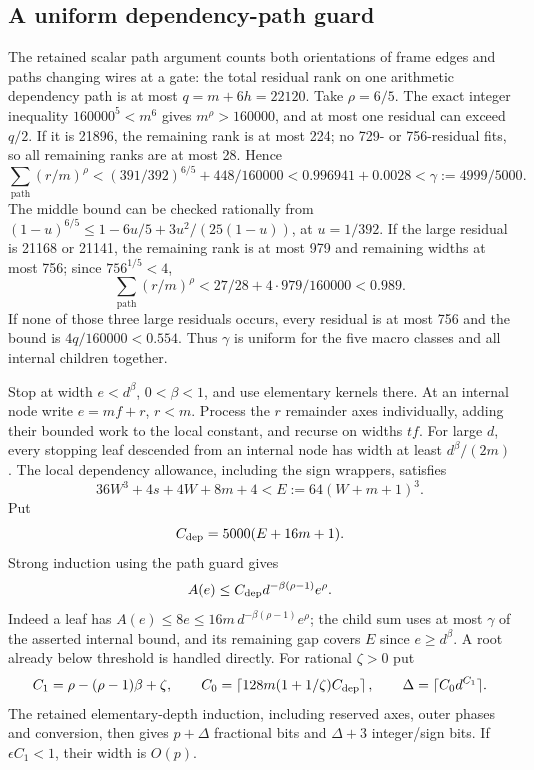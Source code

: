 \subsection{A uniform dependency-path guard}
The retained scalar path argument counts both orientations of frame
edges and paths changing wires at a gate: the total residual rank on
one arithmetic dependency path is at most $q=m+6h=22120$.
Take $\rho=6/5$. The exact integer inequality $160000^5<m^6$ gives
$m^\rho>160000$, and at most one residual can exceed $q/2$.
If it is 21896, the remaining rank is at most 224; no 729- or
756-residual fits, so all remaining ranks are at most 28. Hence
\[
 \sum_{\text{path}}(r/m)^\rho
 <(391/392)^{6/5}+448/160000
 <0.996941+0.0028<\gamma:=4999/5000.
\]
The middle bound can be checked rationally from
$(1-u)^{6/5}\le1-6u/5+3u^2/(25(1-u))$, at $u=1/392$.
If the large residual is 21168 or 21141, the remaining rank is at
most 979 and remaining widths at most 756; since $756^{1/5}<4$,
\[
 \sum_{\text{path}}(r/m)^\rho<27/28+4\cdot979/160000<0.989.
\]
If none of those three large residuals occurs, every residual is at
most 756 and the bound is $4q/160000<0.554$. Thus $\gamma$ is uniform
for the five macro classes and all internal children together.

Stop at width $e<d^\beta$, $0<\beta<1$, and use elementary kernels
there. At an internal node write $e=mf+r$, $r<m$. Process the $r$
remainder axes individually, adding their bounded work to the local
constant, and recurse on widths $tf$. For large $d$, every stopping
leaf descended from an internal node has width at least $d^\beta/(2m)$.
The local dependency allowance, including the sign wrappers, satisfies
\[
 36W^3+4s+4W+8m+4<E:=64(W+m+1)^3.
\]
Put
\[
 C_{\rm dep}=5000(E+16m+1).
\]
Strong induction using the path guard gives
\[
 A(e)\le C_{\rm dep}d^{-\beta(\rho-1)}e^\rho.
\]
Indeed a leaf has $A(e)\le8e\le16m\,d^{-\beta(\rho-1)}e^\rho$;
the child sum uses at most $\gamma$ of the asserted internal bound,
and its remaining gap covers $E$ since $e\ge d^\beta$.
A root already below threshold is handled directly.
For rational $\zeta>0$ put
\[
 C_1=\rho-(\rho-1)\beta+\zeta,\qquad
 C_0=\left\lceil128m(1+1/\zeta)C_{\rm dep}\right\rceil,
 \qquad \Delta=\lceil C_0d^{C_1}\rceil.
\]
The retained elementary-depth induction, including reserved axes,
outer phases and conversion, then gives $p+\Delta$ fractional bits
and $\Delta+3$ integer/sign bits. If $\epsilon C_1<1$, their width
is $O(p)$.

